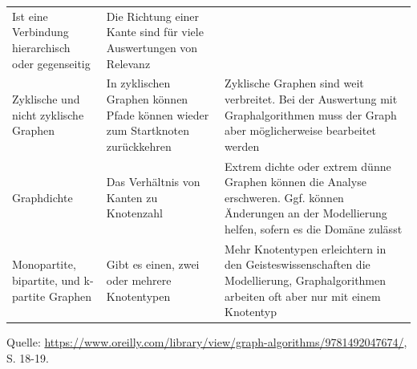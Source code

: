 \documentclass[ngerman,]{scrreprt}
\begin{document}
\begin{longtable}[]{@{}lll@{}}
\begin{minipage}[t]{0.26\columnwidth}
Ist eine Verbindung hierarchisch oder gegenseitig\strut
\end{minipage} & \begin{minipage}[t]{0.44\columnwidth}\raggedright
Die Richtung einer Kante sind für viele Auswertungen von Relevanz\strut
\end{minipage}\tabularnewline
\begin{minipage}[t]{0.22\columnwidth}\raggedright
Zyklische und nicht zyklische Graphen\strut
\end{minipage} & \begin{minipage}[t]{0.26\columnwidth}\raggedright
In zyklischen Graphen können Pfade können wieder zum Startknoten zurückkehren\strut
\end{minipage} & \begin{minipage}[t]{0.44\columnwidth}\raggedright
Zyklische Graphen sind weit verbreitet. Bei der Auswertung mit Graphalgorithmen muss der Graph aber möglicherweise bearbeitet werden\strut
\end{minipage}\tabularnewline
\begin{minipage}[t]{0.22\columnwidth}\raggedright
Graphdichte\strut
\end{minipage} & \begin{minipage}[t]{0.26\columnwidth}\raggedright
Das Verhältnis von Kanten zu Knotenzahl\strut
\end{minipage} & \begin{minipage}[t]{0.44\columnwidth}\raggedright
Extrem dichte oder extrem dünne Graphen können die Analyse erschweren. Ggf. können Änderungen an der Modellierung helfen, sofern es die Domäne zulässt\strut
\end{minipage}\tabularnewline
\begin{minipage}[t]{0.22\columnwidth}\raggedright
Monopartite, bipartite, und k-partite Graphen\strut
\end{minipage} & \begin{minipage}[t]{0.26\columnwidth}\raggedright
Gibt es einen, zwei oder mehrere Knotentypen\strut
\end{minipage} & \begin{minipage}[t]{0.44\columnwidth}\raggedright
Mehr Knotentypen erleichtern in den Geisteswissenschaften die Modellierung, Graphalgorithmen arbeiten oft aber nur mit einem Knotentyp\strut
\end{minipage}\tabularnewline
\bottomrule
\end{longtable}

Quelle: \href{Needham/Hodler\%202019}{https://www.oreilly.com/library/view/graph-algorithms/9781492047674/}, S. 18-19.
\end{document}
